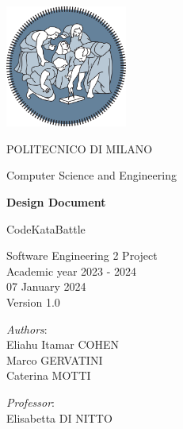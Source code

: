 \begin{titlingpage}
	\begin{center}
		\includegraphics[width=0.3\textwidth]{images/logo_polimi.png}
		
		\vspace{0.25cm}
		
		\LARGE POLITECNICO DI MILANO\\
		
		\vspace{0.2cm}
		
		\Large Computer Science and Engineering
		
		\vspace{0.8cm}
	
		\Huge \textbf{Design Document}
		
		\vspace{0.5cm}
		\huge CodeKataBattle
		
		\vspace{1.5cm}
		\LARGE Software Engineering 2 Project\\
		\Large Academic year 2023 - 2024\\
		\vspace{1cm}
		07 January 2024\\Version 1.0
		\vspace{3cm}
		
		\large
		\begin{minipage}{.4\textwidth}
			\textit{Authors}:\\
			Eliahu Itamar COHEN\\
			Marco GERVATINI\\
                Caterina MOTTI
		\end{minipage}%
		\begin{minipage}{.4\textwidth}
			\raggedleft	
			\textit{Professor}:\\
			Elisabetta DI NITTO\\
			\phantom{placeholder}
		\end{minipage}%
		\begin{minipage}{.1\textwidth}
			\null
		\end{minipage}
	
			
		\end{center}
\end{titlingpage}
